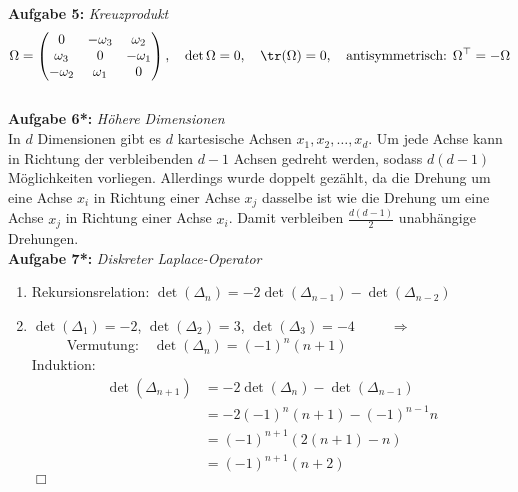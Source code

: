 \textbf{Aufgabe 5: } \emph{Kreuzprodukt}
\begin{align*}
\Omega=\begin{pmatrix}0 & -\omega_3 & \omega_2\\
\omega_3 & 0 & -\omega_1 \\
-\omega_2 & \omega_1 & 0
\end{pmatrix}, \quad \det\Omega=0, \quad \tr(\Omega)=0, \quad \text{antisymmetrisch: }\Omega^\top=-\Omega
\end{align*}\\[0.5cm]
%
\textbf{Aufgabe 6*: } \emph{Höhere Dimensionen}\\[0.2cm]
In $d$ Dimensionen gibt es $d$ kartesische Achsen $x_1,x_2,\dots,x_d$. Um jede Achse kann in Richtung der verbleibenden $d-1$ Achsen gedreht werden, sodass $d(d-1)$ Möglichkeiten vorliegen. Allerdings wurde doppelt gezählt, da die Drehung um eine Achse $x_i$ in Richtung einer Achse $x_j$ dasselbe ist wie die Drehung um eine Achse $x_j$ in Richtung einer Achse $x_i$. Damit verbleiben $\frac{d(d-1)}{2}$ unabhängige Drehungen.\\[1cm]
%
\textbf{Aufgabe 7*: } \emph{Diskreter Laplace-Operator}
\begin{enumerate}
\item Rekursionsrelation: $\det(\Delta_n)=-2\det(\Delta_{n-1})-\det(\Delta_{n-2})$
\item $\det(\Delta_1)=-2$, $\det(\Delta_2)=3$, $\det(\Delta_3)=-4$\ \ \ \ \  $\Rightarrow$\ \ \ \ \  Vermutung:\ \ $\det(\Delta_n)=(-1)^n(n+1)$\\[0.3cm]
Induktion:
\begin{align*}
\det(\Delta_{n+1})&=-2\det(\Delta_{n})-\det(\Delta_{n-1})\\
&=-2(-1)^n (n+1)-(-1)^{n-1}n\\
&=(-1)^{n+1}\left(2(n+1)-n\right)\\
&=(-1)^{n+1}(n+2)
\end{align*}\hfill$\Box$
\end{enumerate}